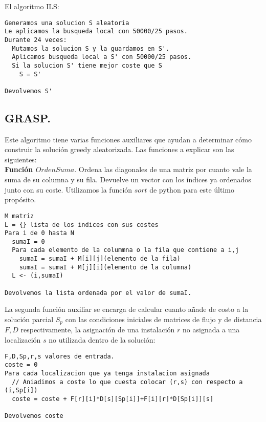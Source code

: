 El algoritmo ILS:\\

\noindent\hrulefill
\begin{lstlisting}
Generamos una solucion S aleatoria
Le aplicamos la busqueda local con 50000/25 pasos.
Durante 24 veces:
  Mutamos la solucion S y la guardamos en S'.
  Aplicamos busqueda local a S' con 50000/25 pasos.
  Si la solucion S' tiene mejor coste que S
    S = S'

Devolvemos S'
\end{lstlisting}

\subsection{GRASP.}

Este algoritmo tiene varias funciones auxiliares que ayudan a determinar cómo construir la solución greedy aleatorizada. Las funciones a explicar son las siguientes:\\

\textbf{Función $OrdenSuma$}. Ordena las diagonales de una matriz por cuanto vale la suma de su columna y su fila. Devuelve un vector con los índices ya ordenados junto con su coste. Utilizamos la función $sort$ de python para este último propósito. 

\noindent\hrulefill

\begin{lstlisting}
M matriz
L = {} lista de los indices con sus costes
Para i de 0 hasta N
  sumaI = 0
  Para cada elemento de la colummna o la fila que contiene a i,j
    sumaI = sumaI + M[i][j](elemento de la fila)
    sumaI = sumaI + M[j][i](elemento de la columna)
  L <- (i,sumaI)

Devolvemos la lista ordenada por el valor de sumaI.
\end{lstlisting}

\noindent\hrulefill

La segunda función auxiliar se encarga de calcular cuanto añade de costo a la solución parcial $S_p$ con las condiciones iniciales de matrices de flujo y de distancia $F,D$ respectivamente, la asignación de una instalación $r$ no asignada a una localización $s$ no utilizada dentro de la solución:\\

\noindent\hrulefill

\begin{lstlisting}
F,D,Sp,r,s valores de entrada.
coste = 0
Para cada localizacion que ya tenga instalacion asignada
  // Aniadimos a coste lo que cuesta colocar (r,s) con respecto a (i,Sp[i])
  coste = coste + F[r][i]*D[s][Sp[i]]+F[i][r]*D[Sp[i]][s]

Devolvemos coste
\end{lstlisting}

